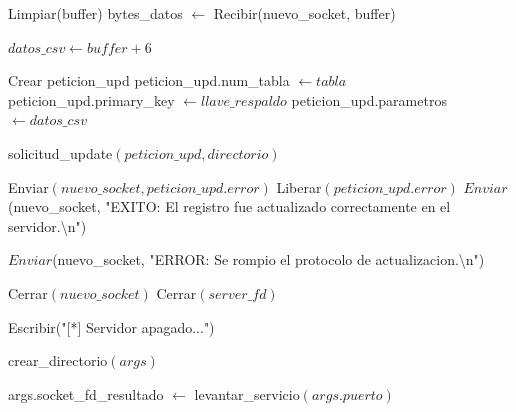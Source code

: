 \begin{tcolorbox}[colback=white, colframe=azul_unam, 
title=Pseudocódigo: servidor.c, breakable]
\begin{algorithmic}[1]
        \State Limpiar(buffer)
        \State bytes\_datos $\gets$ Recibir(nuevo\_socket, buffer)


            \State $datos\_csv \gets buffer + 6$

            \State Crear peticion\_upd
            \State peticion\_upd.num\_tabla $\gets tabla$
            \State peticion\_upd.primary\_key $\gets llave\_respaldo$
            \State peticion\_upd.parametros $\gets datos\_csv$

            \State solicitud\_update$(peticion\_upd, directorio)$

                \State Enviar$(nuevo\_socket, peticion\_upd.error)$
                \State Liberar$(peticion\_upd.error)$
            \Else
                \State $Enviar$(nuevo\_socket, "EXITO: El registro fue actualizado correctamente en el servidor.\textbackslash n")
            \EndIf

        \Else
            \State $Enviar$(nuevo\_socket, "ERROR: Se rompio el protocolo de actualizacion.\textbackslash n")
        \EndIf

    \EndIf

\EndWhile

\State Cerrar$(nuevo\_socket)$
\State Cerrar$(server\_fd)$

\State Escribir("[*] Servidor apagado...")

\EndProcedure

\vspace{0.3cm}


\State crear\_directorio$(args)$
\EndProcedure

\State args.socket\_fd\_resultado $\gets$ levantar\_servicio$(args.puerto)$
\EndProcedure

\end{algorithmic}
\end{tcolorbox}


